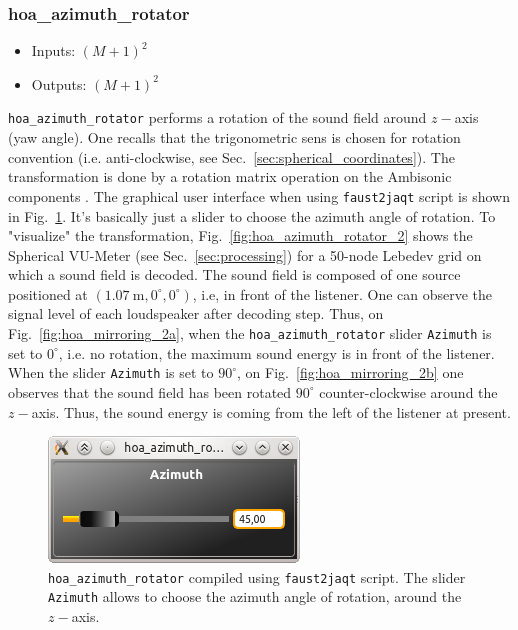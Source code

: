\documentclass[10pt,a4paper]{article}
\begin{document}
\subsubsection{hoa\_azimuth\_rotator}
\label{sec:hoa_azimuth_rotator}
\begin{itemize}
\item Inputs: $(M+1)^2$
\item Outputs: $(M+1)^2$
\end{itemize}
\lstinline'hoa_azimuth_rotator' performs a rotation of the sound field around $z-$axis (yaw angle). One recalls that the trigonometric sens is chosen for rotation convention (i.e. anti-clockwise, see Sec.~\ref{sec:spherical_coordinates}). The transformation is done by a rotation matrix operation on the Ambisonic components \cite{daniel2000representation, moreau2006etude,kronlachner2014spatial}. The graphical user interface when using \lstinline'faust2jaqt' script is shown in Fig.~\ref{fig:hoa_azimuth_rotator}. It's basically just a slider to choose the azimuth angle of rotation. To "visualize" the transformation, Fig.~\ref{fig:hoa_azimuth_rotator_2} shows the Spherical VU-Meter (see Sec.~\ref{sec:processing}) for a 50-node Lebedev grid on which a sound field is decoded. The sound field is composed of one source positioned at $(1.07~\text{m}, 0^\circ, 0^\circ)$, i.e, in front of the listener. One can observe the signal level of each loudspeaker after decoding step. Thus, on Fig.~\ref{fig:hoa_mirroring_2a}, when the \lstinline'hoa_azimuth_rotator' slider \lstinline'Azimuth' is set to $0^\circ$, i.e. no rotation, the maximum sound energy is in front of the listener. When the slider \lstinline'Azimuth' is set to $90^\circ$, on Fig.~\ref{fig:hoa_mirroring_2b} one observes that the sound field has been rotated $90^\circ$ counter-clockwise around the $z-$axis. Thus, the sound energy is coming from the left of the listener at present.
\begin{figure}[!ht]
\centering
\includegraphics[width=0.3\columnwidth]{hoa_azimuth_rotator.png}
\caption{\lstinline'hoa_azimuth_rotator' compiled using \lstinline'faust2jaqt' script. The slider \lstinline'Azimuth' allows to choose the azimuth angle of rotation, around the $z-$axis.}
\label{fig:hoa_azimuth_rotator}
\end{figure}
\end{document}
